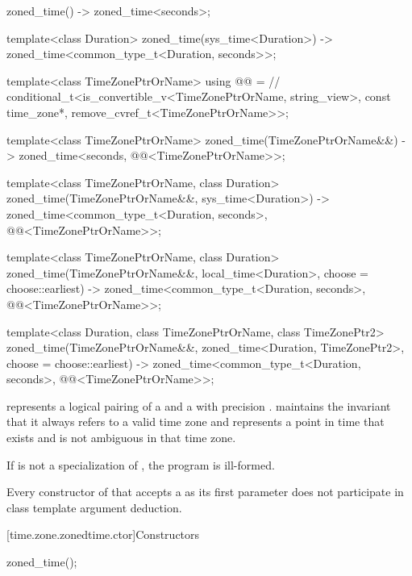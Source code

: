 \begin{codeblock}
{  zoned_time() -> zoned_time<seconds>;

  template<class Duration>
    zoned_time(sys_time<Duration>)
      -> zoned_time<common_type_t<Duration, seconds>>;

  template<class TimeZonePtrOrName>
    using @@ =        // \expos
      conditional_t<is_convertible_v<TimeZonePtrOrName, string_view>,
                    const time_zone*,
                    remove_cvref_t<TimeZonePtrOrName>>;

  template<class TimeZonePtrOrName>
    zoned_time(TimeZonePtrOrName&&)
      -> zoned_time<seconds, @@<TimeZonePtrOrName>>;

  template<class TimeZonePtrOrName, class Duration>
    zoned_time(TimeZonePtrOrName&&, sys_time<Duration>)
      -> zoned_time<common_type_t<Duration, seconds>,
                    @@<TimeZonePtrOrName>>;

  template<class TimeZonePtrOrName, class Duration>
    zoned_time(TimeZonePtrOrName&&, local_time<Duration>,
               choose = choose::earliest)
      -> zoned_time<common_type_t<Duration, seconds>,
                    @@<TimeZonePtrOrName>>;

  template<class Duration, class TimeZonePtrOrName, class TimeZonePtr2>
    zoned_time(TimeZonePtrOrName&&, zoned_time<Duration, TimeZonePtr2>,
               choose = choose::earliest)
      -> zoned_time<common_type_t<Duration, seconds>,
                    @@<TimeZonePtrOrName>>;
}
\end{codeblock}

\pnum
{} represents a logical pairing of
a  and a  with precision .
 maintains the invariant that
it always refers to a valid time zone and
represents a point in time that exists and is not ambiguous
in that time zone.

\pnum
If  is not a specialization of ,
the program is ill-formed.

\pnum
Every constructor of  that
accepts a  as its first parameter
does not participate in
class template argument deduction.

[time.zone.zonedtime.ctor]{Constructors}

%
\begin{itemdecl}
zoned_time();
\end{itemdecl}


